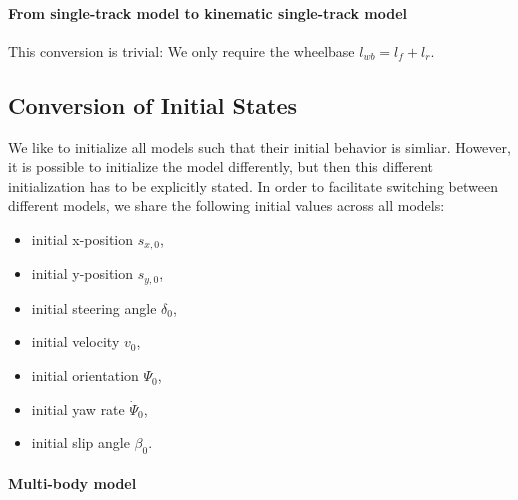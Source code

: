 \documentclass[11pt,a4paper]{article}
\renewcommand{\^}[1]{^{(#1)}}
\begin{document}
\paragraph{From single-track model to kinematic single-track model}

This conversion is trivial: We only require the wheelbase $l_{wb} = l_f + l_r$. 



\subsection{Conversion of Initial States}

We like to initialize all models such that their initial behavior is simliar. However, it is possible to initialize the model differently, but then this different initialization has to be explicitly stated. In order to facilitate switching between different models, we share the following initial values across all models:
\begin{itemize}
 \item initial x-position $s_{x,0}$,
 \item initial y-position $s_{y,0}$,
 \item initial steering angle $\delta_0$,
 \item initial velocity $v_0$,
 \item initial orientation $\Psi_0$,
 \item initial yaw rate $\dot{\Psi}_0$,
 \item initial slip angle $\beta_0$.
\end{itemize}

\paragraph{Multi-body model}
\end{document}
